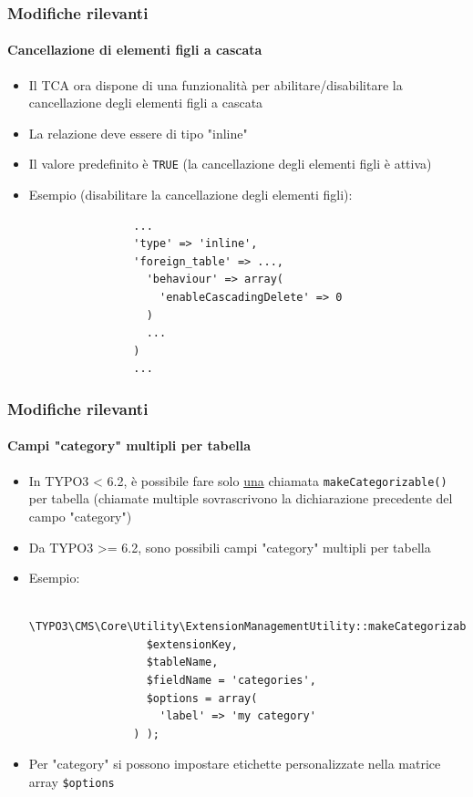 
\begin{frame}[fragile]
	\frametitle{Modifiche rilevanti}
	\framesubtitle{Cancellazione di elementi figli a cascata}

	\begin{itemize}
		\item Il TCA ora dispone di una funzionalità per abilitare/disabilitare la cancellazione degli elementi figli a cascata
		\item La relazione deve essere di tipo "inline"
		\item Il valore predefinito è \texttt{TRUE} (la cancellazione degli elementi figli è attiva)
		\item Esempio (disabilitare la cancellazione degli elementi figli):

			\begin{lstlisting}
				...
				'type' => 'inline',
				'foreign_table' => ...,
				  'behaviour' => array(
				    'enableCascadingDelete' => 0
				  )
				  ...
				)
				...
			\end{lstlisting}

	\end{itemize}

\end{frame}


\begin{frame}[fragile]
	\frametitle{Modifiche rilevanti}
	\framesubtitle{Campi "category" multipli per tabella}

	\begin{itemize}
		\item In TYPO3 < 6.2, è possibile fare solo \underline{una} chiamata \texttt{makeCategorizable()} per tabella
			(chiamate multiple sovrascrivono la dichiarazione precedente del campo "category")
		\item Da TYPO3 >= 6.2, sono possibili campi "category" multipli per tabella
		\item Esempio:

			\begin{lstlisting}
				\TYPO3\CMS\Core\Utility\ExtensionManagementUtility::makeCategorizable(
				  $extensionKey,
				  $tableName,
				  $fieldName = 'categories',
				  $options = array(
				  	'label' => 'my category'
				) );
			\end{lstlisting}

		\item Per "category" si possono impostare etichette personalizzate nella matrice array \texttt{\$options}

	\end{itemize}

\end{frame}


